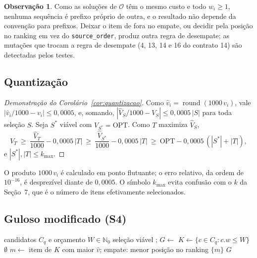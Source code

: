 \documentclass[11pt,a4paper]{article}
\theoremstyle{plain}
\theoremstyle{definition}
\newtheorem{observacao}{Observação}
\theoremstyle{plain}
\begin{document}
\begin{observacao}
Como as soluções de $\mathcal{O}$ têm o mesmo custo e todo $w_i\ge 1$, nenhuma sequência
é prefixo próprio de outra, e o resultado não depende da convenção para prefixos. Deixar o
item de fora no empate, ou decidir pela posição no ranking em vez do
\texttt{source\_order}, produz outra regra de desempate; as mutações que trocam a
regra de desempate (4, 13, 14 e 16 do contrato 14) são detectadas pelos testes.
\end{observacao}

\subsection{Quantização}

\begin{proof}[Demonstração do Corolário~\ref{cor:quantizacao}]
Como $\hat{v}_i=\operatorname{round}(1000\,v_i)$, vale $|\hat{v}_i/1000-v_i|\le 0{,}0005$, e,
somando, $|\hat{V}_S/1000-V_S|\le 0{,}0005\,|S|$ para toda seleção $S$. Seja $S^\ast$
viável com $V_{S^\ast}=\mathrm{OPT}$. Como $T$ maximiza $\hat{V}_S$,
\[
V_T\ \ge\ \frac{\hat{V}_T}{1000}-0{,}0005\,|T|
\ \ge\ \frac{\hat{V}_{S^\ast}}{1000}-0{,}0005\,|T|
\ \ge\ \mathrm{OPT}-0{,}0005\,(|S^\ast|+|T|),
\]
e $|S^\ast|,|T|\le k_{\max}$.
\end{proof}

O produto $1000\,v_i$ é calculado em ponto flutuante; o erro relativo, da ordem de
$10^{-16}$, é desprezível diante de $0{,}0005$. O símbolo $k_{\max}$ evita confusão com o
$k$ da Seção~7, que é o número de itens efetivamente selecionados.

\subsection{Guloso modificado (S4)}

\begin{algorithm}[htbp]
\caption{Guloso modificado (\texttt{guloso\_modificado}, S4)}
\label{alg:s4}
\begin{algorithmic}[1]
\Require candidatos $C_q$ e orçamento $W\in\mathbb{N}_0$
\Ensure seleção viável
  \State {}; $G\gets$ 
  \State $K\gets\{c\in C_q : c.w\le W\}$ 
   \State \Return $\emptyset$ \EndIf
  \State $m\gets$ item de $K$ com maior $\hat{v}$; empate: menor posição no ranking
   \State \Return $\{m\}$ \EndIf
  \State \Return $G$ 
\EndFunction
\end{algorithmic}
\end{algorithm}
\end{document}
